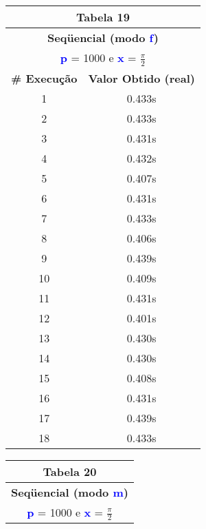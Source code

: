 \documentclass[11pt]{article}
\begin{document}
\begin{table}[!h]
	\begin{center}
		\begin{minipage}{0.48\textwidth}
			\begin{tabular}{| c | c |}
			\hline
			\multicolumn{2}{|c|}{\textbf{Tabela 19}} \\ \hline
			\multicolumn{2}{|c|}{\textbf{Seqüencial (modo \textbf{\textcolor{blue}{f}})}} \\
			\multicolumn{2}{|c|}{\textbf{\textcolor{blue}{p}} = 1000 e \textbf{\textcolor{blue}{x}} = $\frac{\pi}{2}$} \\ [0.2ex]
			\hline
				\textbf{\# Execução} &  \textbf{Valor Obtido (real)} \\ \hline
				1 & 0.433s \\ \hline
				2 & 0.433s \\ \hline
				3 & 0.431s \\ \hline
				4 & 0.432s \\ \hline
				5 & 0.407s \\ \hline
				6 & 0.431s \\ \hline
				7 & 0.433s \\ \hline
				8 & 0.406s \\ \hline
				9 & 0.439s \\ \hline
				10 & 0.409s \\ \hline
				11 & 0.431s \\ \hline
				12 & 0.401s \\ \hline
				13 & 0.430s \\ \hline
				14 & 0.430s \\ \hline
				15 & 0.408s \\ \hline
				16 & 0.431s \\ \hline
				17 & 0.439s \\ \hline
				18 & 0.433s \\ \hline
			\end{tabular}
		\end{minipage}
		\begin{minipage}{0.48\textwidth}
			\begin{tabular}{| c | c |}
			\hline
			\multicolumn{2}{|c|}{\textbf{Tabela 20}} \\ \hline
			\multicolumn{2}{|c|}{\textbf{Seqüencial (modo \textbf{\textcolor{blue}{m}})}} \\
			\multicolumn{2}{|c|}{\textbf{\textcolor{blue}{p}} = 1000 e \textbf{\textcolor{blue}{x}} = $\frac{\pi}{2}$} \\ [0.2ex]
			\hline

\end{tabular}
\end{minipage}
\end{center}
\end{table}
\end{document}
